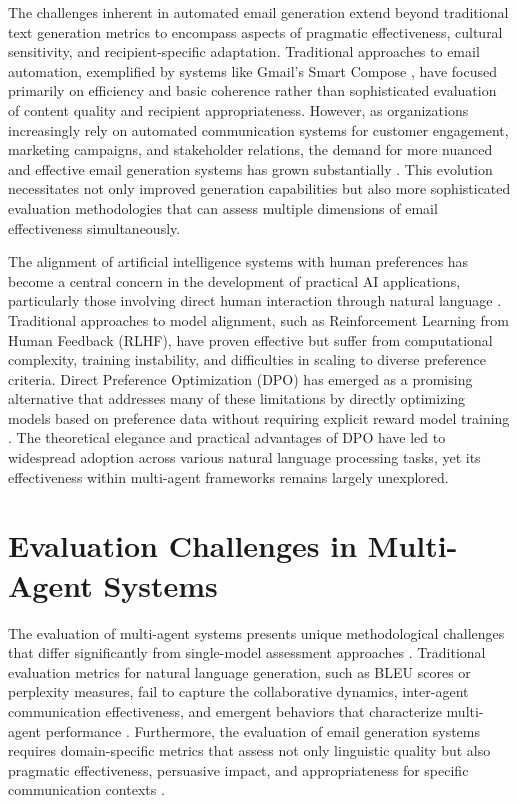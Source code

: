 The challenges inherent in automated email generation extend beyond traditional text generation metrics to encompass aspects of pragmatic effectiveness, cultural sensitivity, and recipient-specific adaptation. Traditional approaches to email automation, exemplified by systems like Gmail's Smart Compose \cite{chen2019gmail_smart_compose}, have focused primarily on efficiency and basic coherence rather than sophisticated evaluation of content quality and recipient appropriateness. However, as organizations increasingly rely on automated communication systems for customer engagement, marketing campaigns, and stakeholder relations, the demand for more nuanced and effective email generation systems has grown substantially \cite{henderson2017smart_reply, li2023generative_judge}. This evolution necessitates not only improved generation capabilities but also more sophisticated evaluation methodologies that can assess multiple dimensions of email effectiveness simultaneously.

The alignment of artificial intelligence systems with human preferences has become a central concern in the development of practical AI applications, particularly those involving direct human interaction through natural language \cite{rafailov2023dpo, wang2024asft}. Traditional approaches to model alignment, such as Reinforcement Learning from Human Feedback (RLHF), have proven effective but suffer from computational complexity, training instability, and difficulties in scaling to diverse preference criteria. Direct Preference Optimization (DPO) has emerged as a promising alternative that addresses many of these limitations by directly optimizing models based on preference data without requiring explicit reward model training \cite{muldrew2024active_preference, gallego2024configurable_safety}. The theoretical elegance and practical advantages of DPO have led to widespread adoption across various natural language processing tasks, yet its effectiveness within multi-agent frameworks remains largely unexplored.

\section{Evaluation Challenges in Multi-Agent Systems}

The evaluation of multi-agent systems presents unique methodological challenges that differ significantly from single-model assessment approaches \cite{yehudai2025survey_llm_agents, wang2024dynamic_evaluation}. Traditional evaluation metrics for natural language generation, such as BLEU scores or perplexity measures, fail to capture the collaborative dynamics, inter-agent communication effectiveness, and emergent behaviors that characterize multi-agent performance \cite{schmidtova2024nlg_metrics, liu2023geval}. Furthermore, the evaluation of email generation systems requires domain-specific metrics that assess not only linguistic quality but also pragmatic effectiveness, persuasive impact, and appropriateness for specific communication contexts \cite{li2023generative_judge, rony2022rome}.


